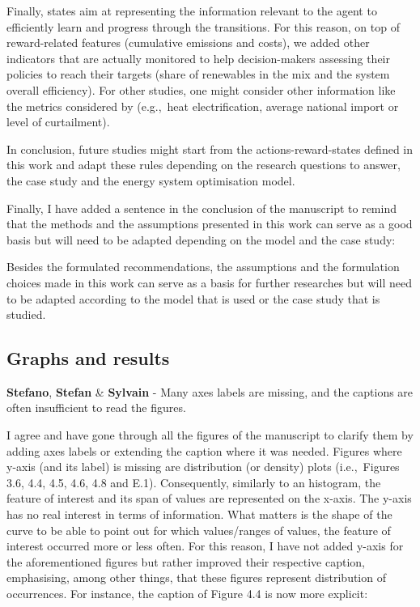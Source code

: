\documentclass[12pt,a4paper]{article}
\def\eg{e.g.,\ }
\def\ie{i.e.,\ }
\begin{document}
\begin{mdframed}[style=manuscript]
Finally, states aim at representing the information relevant to the agent to efficiently learn and progress through the transitions. For this reason, on top of reward-related features (cumulative emissions and costs), we added other indicators that are actually monitored to help decision-makers assessing their policies to reach their targets (share of renewables in the mix and the system overall efficiency). For other studies, one might consider other information like the metrics considered by \citet{pickering2022diversity} (\eg heat electrification, average national import or level of curtailment).

In conclusion, future studies might start from the actions-reward-states defined in this work and adapt these rules depending on the research questions to answer, the case study and the energy system optimisation model.
\end{mdframed}

Finally, I have added a sentence {\color{blue}in the conclusion of the manuscript} to remind that the methods and the assumptions presented in this work can serve as a good basis but will need to be adapted depending on the model and the case study:

\begin{mdframed}[style=manuscript] %
Besides the formulated recommendations, the assumptions and the formulation choices made in this work can serve as a basis for further researches but will need to be adapted according to the model that is used or the case study that is studied.
\end{mdframed}

\subsection{Graphs and results}
\label{general_graphs_results}

\begin{mdframed}[style=comment] %
{\color{orange} \textbf{Stefano}}, {\color{teal} \textbf{Stefan}} \& {\color{purple} \textbf{Sylvain}} - Many axes labels are missing, and the captions are often insufficient to read the figures. 
\end{mdframed}

\noindent I agree and have gone through all the figures of the manuscript to clarify them by adding axes labels or extending the caption where it was needed. Figures where y-axis (and its label) is missing are distribution (or density) plots (\ie Figures 3.6, 4.4, 4.5, 4.6, 4.8 and E.1).  Consequently, similarly to an histogram, the feature of interest and its span of values are represented on the x-axis. The y-axis has no real interest in terms of information. What matters is the shape of the curve to be able to point out for which values/ranges of values, the feature of interest occurred more or less often.  For this reason, I have not added y-axis for the aforementioned figures but rather improved their respective caption, emphasising, among other things, that these figures represent distribution of occurrences. For instance, the caption of {\color{blue}Figure 4.4} is now more explicit:
\end{document}
